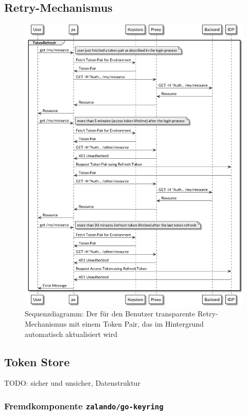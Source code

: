 \subsection{Retry-Mechanismus}
\label{sec:retry-mechanism}

\begin{figure}
    \centering
    \includegraphics[width=\linewidth]{pics/sequence-retry.png}
    \caption{Sequenzdiagramm: Der für den Benutzer transparente Retry-Mechanismus mit einem Token Pair, das im Hintergrund automatisch aktualisiert wird}
\end{figure}

\subsection{Token Store}
\label{sec:realisierung-token-store}

TODO: sicher und unsicher, Datenstruktur

\subsubsection{Fremdkomponente \texttt{zalando/go-keyring}}
